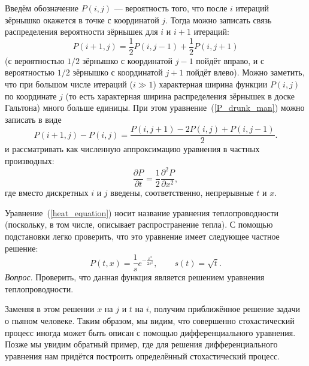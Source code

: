 \documentclass{book}
\begin{document}
Введём обозначение $P(i, j)$ --- вероятность того, что после $i$ итераций зёрнышко окажется в точке с
координатой $j$. Тогда можно записать связь распределения вероятности зёрнышек для $i$ и $i+1$
итераций:
\begin{equation}
    \label{P_drunk_man}
    P(i+1, j) = \frac{1}{2} P(i, j - 1) + \frac{1}{2} P(i, j + 1)
\end{equation}
(с вероятностью $1/2$ зёрнышко с координатой $j - 1$ пойдёт вправо, и с вероятностью $1/2$ зёрнышко
с координатой $j + 1$ пойдёт влево).
Можно заметить, что при большом числе итераций ($i \gg 1$) характерная ширина
функции $P(i, j)$ по координате $j$ (то есть характерная ширина распределения зёрнышек в доске
Гальтона) много больше единицы. При этом уравнение~(\ref{P_drunk_man}) можно записать в виде
\begin{equation}
    P(i+1, j) - P(i, j) = \frac{P(i, j + 1) - 2 P(i, j) + P(i, j - 1)}{2}.
\end{equation}
и рассматривать как численную аппроксимацию уравнения в частных производных:
\begin{equation}
    \label{heat_equation}
    \frac{\partial P}{\partial t} = \frac{1}{2} \frac{\partial^2 P}{\partial x^2},
\end{equation}
где вместо дискретных $i$ и $j$ введены, соответственно, непрерывные $t$ и $x$.

Уравнение~(\ref{heat_equation}) носит название уравнения теплопроводности (поскольку, в том числе,
описывает распространение тепла). С помощью подстановки легко проверить, что это уравнение имеет
следующее частное решение:
\begin{equation}
    P(t, x) = \frac{1}{s} e^{-\frac{x^2}{2 s^2}}, \qquad s(t) = \sqrt{t}.
\end{equation}
\textit{Вопрос}. Проверить, что данная функция является решением уравнения теплопроводности.

Заменяя в этом решении $x$ на $j$ и $t$ на $i$, получим приближённое решение задачи о пьяном человеке. Таким
образом, мы видим, что совершенно стохастический процесс иногда может быть описан с помощью
дифференциального уравнения. Позже мы увидим обратный пример, где для решения дифференциального
уравнения нам придётся построить определённый стохастический процесс.
\end{document}
